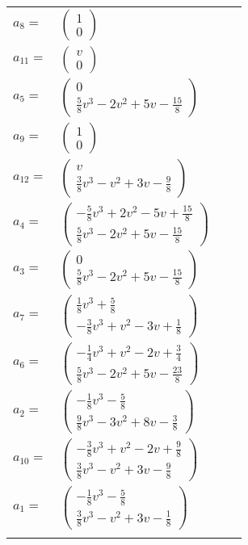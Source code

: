 \documentclass[1p]{elsarticle_modified}
\theoremstyle{definition}
\begin{document}
\begin{tabular}{m{7pt} m{180pt} m{7pt} m{180pt} }
\flushright $a_{8}=$&$\begin{pmatrix}1\\0\end{pmatrix}$ \\
\flushright $a_{11}=$&$\begin{pmatrix}v\\0\end{pmatrix}$ \\
\flushright $a_{5}=$&$\begin{pmatrix}0\\\frac{5}{8} v^3-2 v^2+5 v-\frac{15}{8}\end{pmatrix}$ \\
\flushright $a_{9}=$&$\begin{pmatrix}1\\0\end{pmatrix}$ \\
\flushright $a_{12}=$&$\begin{pmatrix}v\\\frac{3}{8} v^3- v^2+3 v-\frac{9}{8}\end{pmatrix}$ \\
\flushright $a_{4}=$&$\begin{pmatrix}-\frac{5}{8} v^3+2 v^2-5 v+\frac{15}{8}\\\frac{5}{8} v^3-2 v^2+5 v-\frac{15}{8}\end{pmatrix}$ \\
\flushright $a_{3}=$&$\begin{pmatrix}0\\\frac{5}{8} v^3-2 v^2+5 v-\frac{15}{8}\end{pmatrix}$ \\
\flushright $a_{7}=$&$\begin{pmatrix}\frac{1}{8} v^3+\frac{5}{8}\\-\frac{3}{8} v^3+v^2-3 v+\frac{1}{8}\end{pmatrix}$ \\
\flushright $a_{6}=$&$\begin{pmatrix}-\frac{1}{4} v^3+v^2-2 v+\frac{3}{4}\\\frac{5}{8} v^3-2 v^2+5 v-\frac{23}{8}\end{pmatrix}$ \\
\flushright $a_{2}=$&$\begin{pmatrix}-\frac{1}{8} v^3-\frac{5}{8}\\\frac{9}{8} v^3-3 v^2+8 v-\frac{3}{8}\end{pmatrix}$ \\
\flushright $a_{10}=$&$\begin{pmatrix}-\frac{3}{8} v^3+v^2-2 v+\frac{9}{8}\\\frac{3}{8} v^3- v^2+3 v-\frac{9}{8}\end{pmatrix}$ \\
\flushright $a_{1}=$&$\begin{pmatrix}-\frac{1}{8} v^3-\frac{5}{8}\\\frac{3}{8} v^3- v^2+3 v-\frac{1}{8}\end{pmatrix}$\\&\end{tabular}
\end{document}
